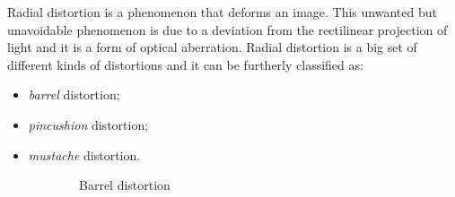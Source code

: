 \documentclass[12pt]{article}
\begin{document}
Radial distortion is a phenomenon that deforms an image. This unwanted but unavoidable phenomenon is due to a deviation from the rectilinear projection of light and it is a form of optical aberration. Radial distortion is a big set of different kinds of distortions and it can be furtherly classified as:
%
\begin{itemize}
	\setlength\itemsep{0em}
	\item \textit{barrel} distortion;
	\item \textit{pincushion} distortion;
	\item \textit{mustache} distortion.
\end{itemize}
%
\begin{figure}[h!]
	\centering
	\begin{subfigure}{0.30\linewidth}
		\centering
		\caption{Barrel distortion}
		\label{barrel}
	\end{subfigure}\hfill
	\begin{subfigure}{0.30\linewidth}
		\centering

\end{subfigure}
\end{figure}
\end{document}
